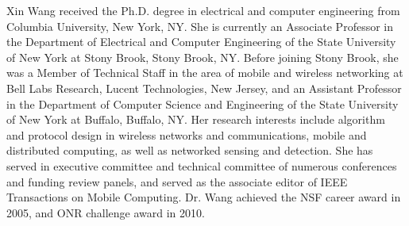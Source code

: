 \documentclass[10pt,journal,compsoc]{IEEEtran}
\begin{document}
\begin{IEEEbiography}{Xin Wang}
 received the Ph.D. degree in electrical and computer engineering from Columbia University, New York, NY.
She is currently an Associate Professor in the Department of Electrical and Computer Engineering of the State University of New York at Stony Brook, Stony Brook, NY. Before joining Stony Brook, she was a Member of Technical Staff in the area of mobile and wireless networking at Bell Labs Research, Lucent Technologies, New Jersey, and an Assistant Professor in the Department of Computer Science and Engineering of the State University of New York at Buffalo, Buffalo, NY. Her research interests include algorithm and protocol design in wireless networks and communications, mobile and distributed computing, as well as networked sensing and detection. She has served in executive committee and technical committee of numerous conferences and funding review panels, and served as the associate editor of IEEE Transactions on Mobile Computing. Dr. Wang achieved the NSF career award in 2005, and ONR challenge award in 2010.
\end{IEEEbiography}
\end{document}
